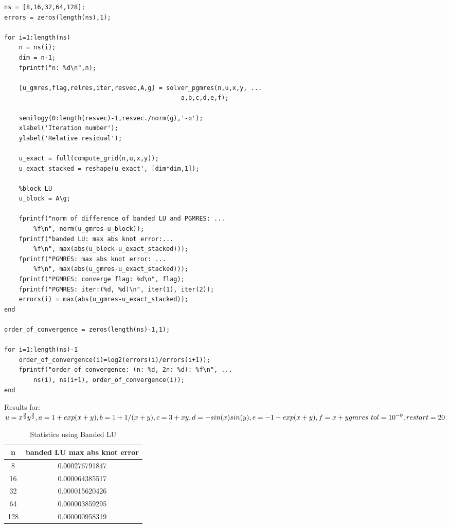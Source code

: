 \documentclass[12pt,letter]{article}
\begin{document}
\begin{enumerate}
\begin{enumerate}
\begin{verbatim}
ns = [8,16,32,64,128];
errors = zeros(length(ns),1);

for i=1:length(ns)
    n = ns(i);
    dim = n-1;
    fprintf("n: %d\n",n);

    [u_gmres,flag,relres,iter,resvec,A,g] = solver_pgmres(n,u,x,y, ...
                                                a,b,c,d,e,f);

    semilogy(0:length(resvec)-1,resvec./norm(g),'-o');
    xlabel('Iteration number');
    ylabel('Relative residual');

    u_exact = full(compute_grid(n,u,x,y));
    u_exact_stacked = reshape(u_exact', [dim*dim,1]);

    %block LU
    u_block = A\g;

    fprintf("norm of difference of banded LU and PGMRES: ...
        %f\n", norm(u_gmres-u_block));
    fprintf("banded LU: max abs knot error:...
        %f\n", max(abs(u_block-u_exact_stacked)));
    fprintf("PGMRES: max abs knot error: ...
        %f\n", max(abs(u_gmres-u_exact_stacked)));
    fprintf("PGMRES: converge flag: %d\n", flag);
    fprintf("PGMRES: iter:(%d, %d)\n", iter(1), iter(2));
    errors(i) = max(abs(u_gmres-u_exact_stacked));
end

order_of_convergence = zeros(length(ns)-1,1);

for i=1:length(ns)-1
    order_of_convergence(i)=log2(errors(i)/errors(i+1));
    fprintf("order of convergence: (n: %d, 2n: %d): %f\n", ...
        ns(i), ns(i+1), order_of_convergence(i));
end
\end{verbatim}

\pagebreak

Results for:\\
$
u=x^{\frac{9}{2}}y^{\frac{9}{2}},\\
a = 1 + exp(x + y),\\
b=1+1/(x + y),\\
c=3+xy,\\
d=-sin(x)sin(y),\\
e=-1-exp(x + y),\\
f=x+y\\
gmres\ tol=10^{-9}, restart=20
$\\

\begin{table}[h]
  \begin{center}
    \begin{tabular}{ | c | c |}
      \hline
      n & banded LU max abs knot error \\
      \hline
      8 & 0.000276791847 \\
      \hline
      16 & 0.000064385517 \\
      \hline
      32 & 0.000015620426 \\
      \hline
      64 & 0.000003859295 \\
      \hline
      128 & 0.000000958319 \\
      \hline
    \end{tabular}
    \caption{Statistics using Banded LU}
  \end{center}
\end{table}


\end{enumerate}
\end{enumerate}
\end{document}
